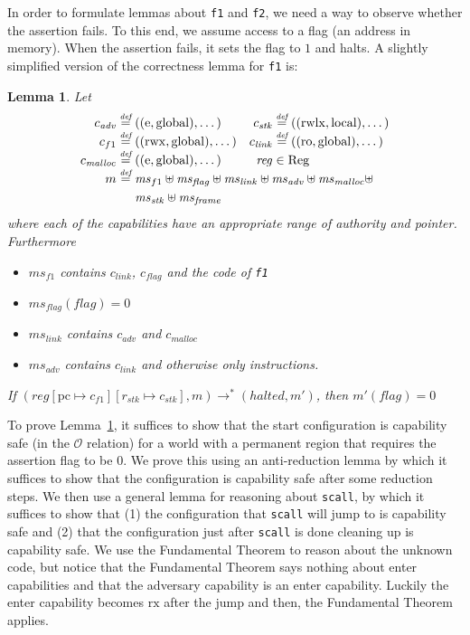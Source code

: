 \documentclass[compsoc,conference,letterpaper,fleqn]{IEEEtran}
\newtheorem{lemma}{Lemma}
\newcommand{\update}[2]{[#1 \mapsto #2]}
\newcommand{\defeq}{\stackrel{\textit{\tiny{def}}}{=}}
\newcommand{\var}[1]{\mathit{#1}}
\newcommand{\hs}{\var{ms}}
\newcommand{\ms}{\hs}
\newcommand{\pcreg}{\mathrm{pc}}
\newcommand{\reg}{\var{reg}}
\newcommand{\adv}{\var{adv}}
\newcommand{\link}{\var{link}}
\newcommand{\stk}{\var{stk}}
\newcommand{\flag}{\var{flag}}
\newcommand{\halted}{\mathit{halted}}
\newcommand{\codelabel}[1]{\mathit{#1}}
\newcommand{\malloc}{\codelabel{malloc}}
\newcommand{\plaindom}[1]{\mathrm{#1}}
\newcommand{\Regs}{\plaindom{Reg}}
\newcommand{\observations}{\mathcal{O}}
\newcommand{\plainperm}[1]{\mathrm{#1}}
\newcommand{\readonly}{\plainperm{ro}}
\newcommand{\exec}{\plainperm{rx}}
\newcommand{\entry}{\plainperm{e}}
\newcommand{\rwx}{\plainperm{rwx}}
\newcommand{\rwlx}{\plainperm{rwlx}}
\newcommand{\local}{\plainperm{local}}
\newcommand{\glob}{\plainperm{global}}
\newcommand{\step}[1][]{\rightarrow_{#1}}
\begin{document}
In order to formulate lemmas about \texttt{\footnotesize{f1}} and \texttt{\footnotesize{f2}}, we
need a way to observe whether the assertion fails. To this end, we
assume access to a flag (an address in memory). When the assertion
fails, it sets the flag to $1$ and halts. A slightly simplified
version of the correctness lemma for \texttt{\footnotesize{f1}} is:
\begin{lemma}
  \label{lem:correctness-f1}
  Let
\[
    \begin{array}{r@{}lr@{}l}
    c_{\var{adv}} & \;\defeq ((\entry,\glob),\dots) & c_{\var{stk}} & \;\defeq ((\rwlx,\local),\dots)\\
    c_{f1} & \;\defeq ((\rwx,\glob),\dots) & c_\link &\; \defeq ((\readonly,\glob),\dots)\\
    c_\malloc &\; \defeq ((\entry,\glob),\dots) & \reg& \; \in \Regs \\
    m &  \multicolumn{3}{@{}l}{\;\defeq \ms_{f1} \uplus \ms_\flag \uplus \ms_{\var{link}} \uplus \hs_\adv \uplus \ms_{\malloc} \uplus} \\
      & \multicolumn{3}{@{}l}{\phantom{\;\defeq \;}  \ms_{\var{stk}} \uplus \ms_{\var{frame}}} \\
    \end{array}
\]
  where each of the capabilities have an appropriate range of authority and pointer. Furthermore
  \begin{itemize}
  \item $\ms_{f1}$ contains $c_\link$, $c_\flag$ and the code of \texttt{\footnotesize{f1}}
  \item $\ms_\flag(\flag) = 0$
  \item $\ms_{\var{link}}$ contains $c_\adv$ and $c_\malloc$
  \item $\hs_\adv$ contains $c_\link$ and otherwise only instructions.
  \end{itemize}
  If $(\reg\update{\pcreg}{c_{f1}}\update{r_\stk}{c_\stk},m) \step^* (\halted,m')$,
  then $m'(\flag) = 0$
\end{lemma}

To prove Lemma~\ref{lem:correctness-f1}, it suffices to show that the start
configuration is capability safe (in the $\observations$ relation) for a world
with a permanent region that requires the assertion flag to be 0. We prove this
using an anti-reduction lemma by which it suffices to show that the
configuration is capability safe after some reduction steps. We then use a general lemma
for reasoning about \texttt{\footnotesize{scall}}, by which it suffices to show that (1) the
configuration that \texttt{\footnotesize{scall}} will jump to is capability safe and (2) that
the configuration just after \texttt{\footnotesize{scall}} is done cleaning up is capability
safe. We use the Fundamental Theorem to reason about the unknown code, but
notice that the Fundamental Theorem says nothing about enter capabilities and
that the adversary capability is an enter capability. Luckily the enter
capability becomes $\exec$ after the jump and then, the Fundamental Theorem
applies.
\end{document}
